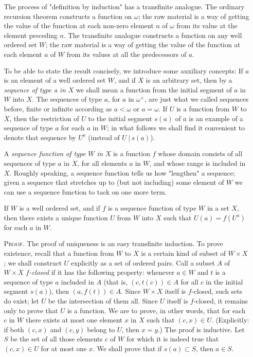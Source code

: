 
The process of "definition by induction" has a   transfinite analogue. The ordinary recursion theorem constructs a function on $\omega$; the raw material is a way of getting the value of the function at each non-zero element $n$ of $\omega$ from its value at the element preceding $n$. The transfinite analogue constructs a function on any well ordered set $W$; the raw material is a way of getting the value of the function at each element $a$ of $W$ from its values at all the predecessors of $a$. 

To be able to state the result concisely, we introduce some auxiliary concepts: If $a$ is an element of a well ordered set $W$, and if $X$ is an arbitrary set, then by a \textit{sequence of type a in $X$} we shall mean a function from the initial segment of $a$ in $W$ into $X$. The sequences of type $a$, for $a$ in $\omega^{+}$, are just what we called sequences before, finite or infinite according as $a < \omega$ or $a =  \omega$. If $U$ is a function from $W$ to $X$, then the restriction of $U$ to the initial segment $s(a)$ of $a$ is an example of a sequence of type $a$ for each $a$ in $W$; in what follows we shall find it convenient to denote that sequence by $U^{a}$ (instead of $U\ |\ s(a)$).

A \textit{sequence function of type $W$ in $X$} is a function $f$ whose domain consists of all sequences of type $a$ in $X$, for all elements $a$ in $W$, and whose range is included in $X$. Roughly speaking, a sequence function tells us how "lengthen" a sequence; given a sequence that stretches up to (but not including) some element of $W$ we can use a sequence function to tack on one more term. 

\begin{named} If $W$ is a well ordered set, and if $f$ is a sequence function of type $W$ in a set $X$, then there exists a unique function $U$ from $W$ into $X$ such that $U(a) = f(U^{a})$ for each $a$ in $W$.
\end{named}

\textsc{Proof}. The proof of uniqueness is an easy transfinite induction. To prove existence, recall that a function from $W$ to $X$ is a certain kind of subset of $W \times X$; we shall construct $U$ explicitly as a set of ordered pairs. Call a subset $A$ of $W \times X$ $f$\textit{-closed} if it has the following property: whenever $a \in W$ and $t$ is a sequence of type $a$ included in $A$ (that is, $(c, t(c)) \in A$ for all $c$ in the initial segment $s(a)$), then $(a,f(t)) \in A$. Since $W \times X$ itself is $f$-closed, such sets do exist; let $U$ be the intersection of them all. Since $U$ itself is $f$-closed, it remains only to prove that $U$ is a function. We are to prove, in other words, that for each $c$ in $W$ there exists at most one element $x$ in $X$ such that $(c,x) \in U$. (Explicitly: if both $(c, x)$ and $(c,y)$ belong to $U$, then $x = y$.) The proof is inductive. Let $S$ be the set of all those elements $c$ of $W$ for which it is indeed true that $(c, x) \in U$ for at most one $x$. We shall prove that if $s(a) \subset S$, then $a \in S$. 

